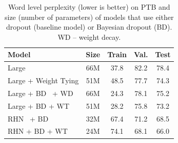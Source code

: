 \documentclass[11pt]{article}
\begin{document}
\begin{table}[t]

\begin{center}
\begin{small}
\tabcolsep=0.11cm

\begin{tabular}{l|cccc}
\hline
Model           &Size&                              Train          & Val. & Test \\
\hline
Large~\protect\cite{zaremba14}           &66M &  37.8       & 82.2                   & 78.4             \\ 
Large + Weight Tying      &51M &  48.5    & 77.7                  & 74.3            \\ 
\hline
Large + BD~\protect\cite{yarin2} + WD &66M &    24.3      &  78.1                 &   75.2          \\ 
Large + BD + WT &51M &    28.2    &   75.8          &   73.2         \\ 
%
\hline
RHN~\protect\cite{rhn} + BD        &32M & 67.4 &71.2	&68.5\\
RHN + BD + WT   &24M & 74.1 & 68.1 &	66.0\\
\hline
\end{tabular}
\end{small}
\end{center}
\caption{\small Word level perplexity (lower is better) on PTB and size (number of parameters) of models that use either dropout (baseline model) or Bayesian dropout (BD). WD -- weight decay.}
\label{tab:lm-ptb-do}
\end{table}
\end{document}
